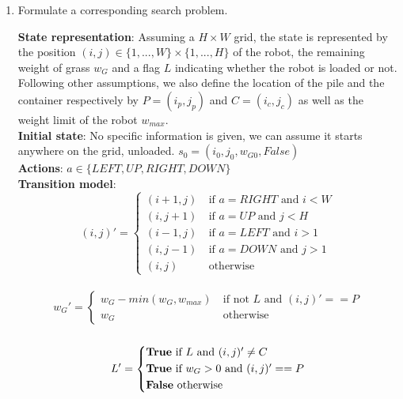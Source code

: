 \documentclass[11pt, a4paper]{article}
\begin{document}
\begin{enumerate}
    \item Formulate a corresponding search problem.
    
    \begin{solution}
        \textbf{State representation}: Assuming a $H\times W$ grid, the state is represented by the position $(i,j) \in \{1,...,W\}\times \{1,...,H\}$ of the robot, the remaining weight of grass $w_G$ and a flag $L$ indicating whether the robot is loaded or not. Following other assumptions, we also define the location of the pile and the container respectively by $P = (i_p,j_p)$ and $C = (i_c,j_c)$ as well as the weight limit of the robot $w_{max}$.\\
        
        \textbf{Initial state}: No specific information is given, we can assume it starts anywhere on the grid, unloaded. $s_0 = (i_0, j_0, w_{G0}, False)$\\
        
        \textbf{Actions}: $a \in \{LEFT, UP, RIGHT, DOWN\}$\\
        
        \textbf{Transition model}: \[(i,j)' = \begin{cases*}
            (i+1,j)\ &\text{if $a = RIGHT$ and $i < W$}\\
            (i,j+1)\ &\text{if $a = UP$ and $j < H$}\\
            (i-1,j)\ &\text{if $a = LEFT$ and $i > 1$}\\
            (i,j-1)\ &\text{if $a = DOWN$ and $j > 1$}\\
            (i,j)\ &\text{otherwise}
        \end{cases*}\]\\
        \[w_G' = \begin{cases*}
            w_G - min(w_G, w_{max})\ &\text{if not $L$ and $(i,j)' == P$}\\
            w_G\ &\text{otherwise}
        \end{cases*}\]\\
        \[L' = \begin{cases*}
            \text{\textbf{True} if $L$ and $(i,j)' \not = C$}\\
            \text{\textbf{True} if $w_G > 0$ and $(i,j)' == P$}\\
            \text{\textbf{False} otherwise}
        \end{cases*}\]\\
        

\end{solution}
\end{enumerate}
\end{document}
